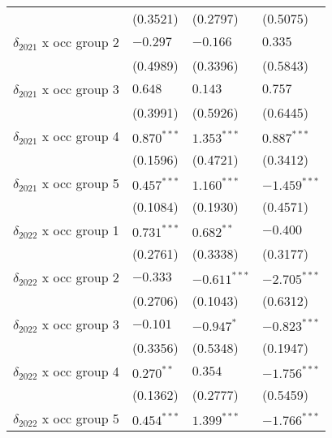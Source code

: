 \begin{tabular}{llll}
                                         &           (0.3521) &           (0.2797) &           (0.5075) \\
$\delta_{2021}$ x occ group 2            &           $-0.297$ &           $-0.166$ &            $0.335$ \\
                                         &           (0.4989) &           (0.3396) &           (0.5843) \\
$\delta_{2021}$ x occ group 3            &            $0.648$ &            $0.143$ &            $0.757$ \\
                                         &           (0.3991) &           (0.5926) &           (0.6445) \\
$\delta_{2021}$ x occ group 4            &      $0.870^{***}$ &      $1.353^{***}$ &      $0.887^{***}$ \\
                                         &           (0.1596) &           (0.4721) &           (0.3412) \\
$\delta_{2021}$ x occ group 5            &      $0.457^{***}$ &      $1.160^{***}$ &     $-1.459^{***}$ \\
                                         &           (0.1084) &           (0.1930) &           (0.4571) \\
$\delta_{2022}$ x occ group 1            &      $0.731^{***}$ &       $0.682^{**}$ &           $-0.400$ \\
                                         &           (0.2761) &           (0.3338) &           (0.3177) \\
$\delta_{2022}$ x occ group 2            &           $-0.333$ &     $-0.611^{***}$ &     $-2.705^{***}$ \\
                                         &           (0.2706) &           (0.1043) &           (0.6312) \\
$\delta_{2022}$ x occ group 3            &           $-0.101$ &         $-0.947^*$ &     $-0.823^{***}$ \\
                                         &           (0.3356) &           (0.5348) &           (0.1947) \\
$\delta_{2022}$ x occ group 4            &       $0.270^{**}$ &            $0.354$ &     $-1.756^{***}$ \\
                                         &           (0.1362) &           (0.2777) &           (0.5459) \\
$\delta_{2022}$ x occ group 5            &      $0.454^{***}$ &      $1.399^{***}$ &     $-1.766^{***}$ \\

\end{tabular}
